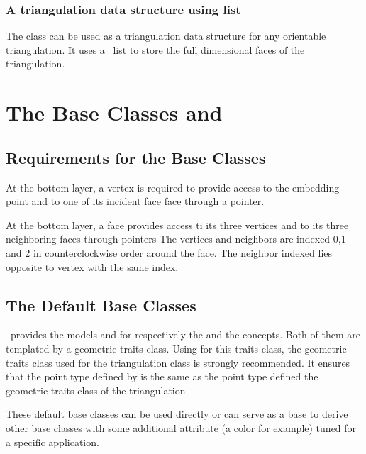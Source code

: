 \subsubsection{A triangulation data structure using list}
The class 
can be used as a triangulation data structure for any
orientable triangulation. It uses a \stl\ list to store the
full dimensional faces of the triangulation.



\section{The Base Classes \protect {} and  \protect {} }
\label{I1_Sect_Base_classes}

\subsection{Requirements for the Base Classes}
At the bottom layer,  
a vertex is required to provide access to the embedding point
and to one of its incident face
face through a
 pointer.


At the bottom layer, a 
face provides access ti its three vertices and to its three
neighboring faces through  pointers
The vertices and neighbors are indexed 0,1 and 2 in counterclockwise
order around the face. The neighbor indexed 
 lies opposite to vertex with the same index.



\subsection{The Default Base Classes}
\cgal\ provides the models
 and
 for 
respectively 
the  and the  concepts.
Both of them are templated by a geometric traits class.
Using for this traits class, the geometric traits class used for the triangulation class
is strongly recommended. 
It ensures that the point type defined by 
is the same as the point type defined the  geometric traits class of
the triangulation.

These default base classes can be used directly or can serve as a base to derive
other base classes with some additional attribute (a color for example)
tuned for a specific application.


